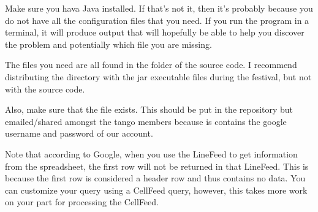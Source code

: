 \documentclass[12pt,final]{article}
\begin{document}
Make sure you hava Java installed. If that's not it, then it's probably
because you do not have all the configuration files that you need. If you run
the program in a terminal, it will produce output that will hopefully be able
to help you discover the problem and potentially which file you are missing.

The files you need are all found in the  folder of the source code.
I recommend distributing the  directory with the jar executable
files during the festival, but not with the source code. 

Also, make sure that the  file exists. This should
 be put in the repository but emailed/shared amongst the tango
members because is contains the google username and password of our account.


Note that according to Google, when you use the LineFeed to get information
from the spreadsheet, the first row will not be returned in that LineFeed.
This is because the first row is considered a header row and thus
contains no data. You can customize your query using a CellFeed query,
however, this takes more work on your part for processing the CellFeed.
\end{document}
